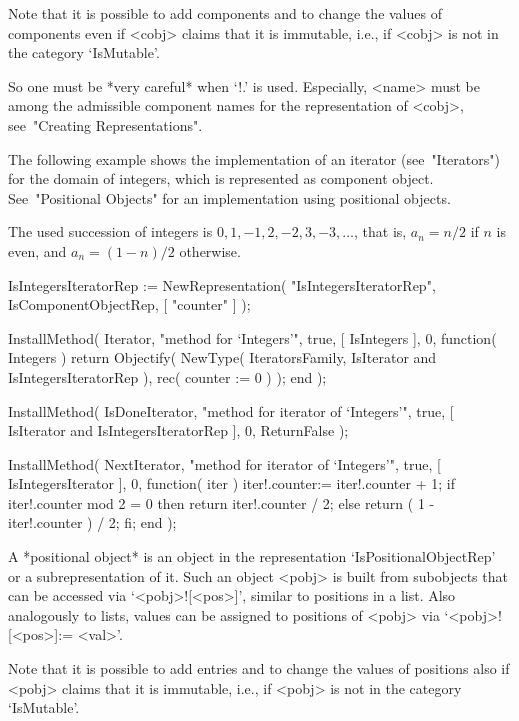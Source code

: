 Note that it is possible to add components and to change the values of
components even if <cobj> claims that it is immutable, i.e., if <cobj>
is not in the category `IsMutable'.

So one must be *very careful* when `!.' is used.
Especially, <name> must be among the admissible component names for
the representation of <cobj>, see~"Creating Representations".

The following example shows the implementation of an iterator
(see~"Iterators") for the domain of integers,
which is represented as component object.
See~"Positional Objects" for an implementation using positional objects.

The used succession of integers is $0, 1, -1, 2, -2, 3, -3, \ldots$,
that is, $a_n = n/2$ if $n$ is even,
and $a_n = (1-n)/2$ otherwise.

\begintt
    IsIntegersIteratorRep := NewRepresentation( "IsIntegersIteratorRep",
        IsComponentObjectRep, [ "counter" ] );

    InstallMethod( Iterator,
        "method for `Integers'",
        true,
        [ IsIntegers ], 0,
        function( Integers )
        return Objectify( NewType( IteratorsFamily,
                                       IsIterator
                                   and IsIntegersIteratorRep ),
                          rec( counter := 0 ) );
        end );

    InstallMethod( IsDoneIterator,
        "method for iterator of `Integers'",
        true,
        [ IsIterator and IsIntegersIteratorRep ], 0,
        ReturnFalse );

    InstallMethod( NextIterator,
        "method for iterator of `Integers'",
        true,
        [ IsIntegersIterator ], 0,
        function( iter )
        iter!.counter:= iter!.counter + 1;
        if iter!.counter mod 2 = 0 then
          return iter!.counter / 2;
        else
          return ( 1 - iter!.counter ) / 2;
        fi;
        end );
\endtt


A *positional object* is an object in the representation
`IsPositionalObjectRep' or a subrepresentation of it.
Such an object <pobj> is built from subobjects that can be accessed via
`<pobj>![<pos>]', similar to positions in a list.
Also analogously to lists, values can be assigned to positions of
<pobj> via `<pobj>![<pos>]:= <val>'.

Note that it is possible to add entries and to change the values of
positions also if <pobj> claims that it is immutable, i.e., if <pobj>
is not in the category `IsMutable'.

